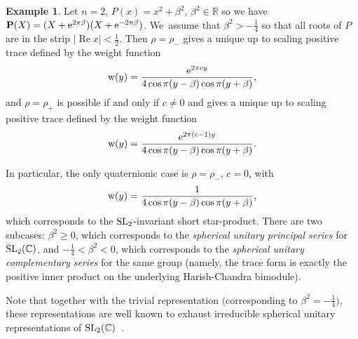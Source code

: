 \documentclass[10pt,a4paper]{amsart}
\renewcommand{\Re}{\operatorname{Re}}
\theoremstyle{definition}
\newtheorem{Example}[Theorem]{Example}
\numberwithin{equation}{section}
\begin{document}
\begin{Example}\label{neq2} Let $n=2$, $P(x)=x^2+\beta^2$, $\beta^2\in \mathbb R$ so we have $\mathbf{P}(X)=(X+{\rm e}^{2\pi\beta})(X+{\rm e}^{-2\pi\beta})$. We~assume that $\beta^2>-\frac{1}{4}$ so that all roots of $P$ are in the strip $|\Re x|<\frac12$. Then $\rho=\rho_-$ gives a unique up to scaling positive trace defined by the weight function
\[
{\rm w}(y)=\frac{{\rm e}^{2\pi cy}}{4\cos \pi(y-\beta)\cos \pi(y+\beta)},
\]
and $\rho=\rho_+$ is possible if and only if $c\ne 0$ and gives a unique up to scaling positive trace defined by the weight function
\[
{\rm w}(y)=\frac{{\rm e}^{2\pi(c-1)y}}{4\cos \pi(y-\beta)\cos \pi(y+\beta)}.
\]

In particular, the only quaternionic case is $\rho=\rho_-$, $c=0$, with
\[
{\rm w}(y)=\frac{1}{4\cos \pi(y-\beta)\cos \pi(y+\beta)},
\]
which corresponds to the ${\rm SL}_2$-invariant short star-product.
There are two subcases: $\beta^2\ge 0$, which corresponds to the
{\it spherical unitary principal series} for ${\rm SL}_2(\mathbb C)$, and
$-\frac{1}{4}<\beta^2<0$, which corresponds to the {\it spherical unitary complementary series} for the same group (namely, the trace form is exactly the positive inner product on the underlying Harish-Chandra bimodule).

Note that together with the trivial representation $\big($corresponding to $\beta^2=-\frac{1}{4}\big)$, these representations are well known to exhaust irreducible spherical unitary representations of ${\rm SL}_2(\mathbb C)$~\cite{V}.
\end{Example}
\end{document}
